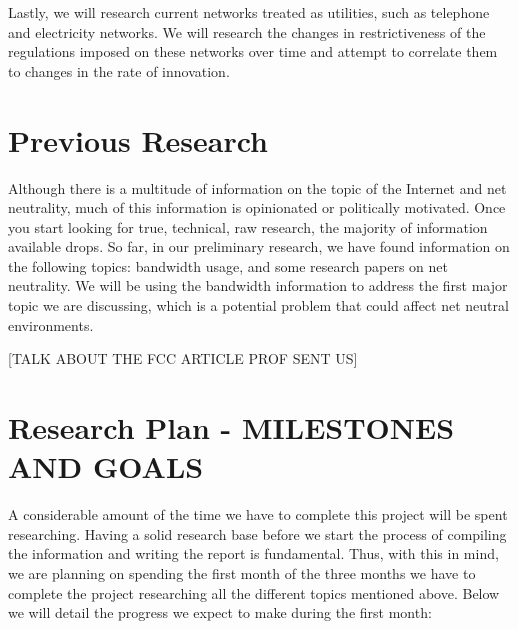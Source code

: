 \documentclass{sigcomm-alternate}
\begin{document}
Lastly, we will research current networks treated as utilities, such as telephone and electricity networks. We will research the changes in restrictiveness of the regulations imposed on these networks over time and attempt to correlate them to changes in the rate of innovation.


\section{Previous Research}
Although there is a multitude of information on the topic of the Internet and net neutrality, much of this information is opinionated or politically motivated. Once you start looking for true, technical, raw research, the majority of information available drops. So far, in our preliminary research, we have found information on the following topics: bandwidth usage, and some research papers on net neutrality. We will be using the bandwidth information to address the first major topic we are discussing, which is a potential problem that could affect net neutral environments. 


[TALK ABOUT THE FCC ARTICLE PROF SENT US]

\cite{FCCTomWheeler}
\cite{1224454}
\cite{1631969}
\cite{5188801}
\cite{5277804}


\section{Research Plan - MILESTONES AND GOALS}


A considerable amount of the time we have to complete this project will be spent researching. Having a solid research base before we start the process of compiling the information and writing the report is fundamental. Thus, with this in mind, we are planning on spending the first month of the three months we have to complete the project researching all the different topics mentioned above. Below we will detail the progress we expect to make during the first month:
\end{document}
